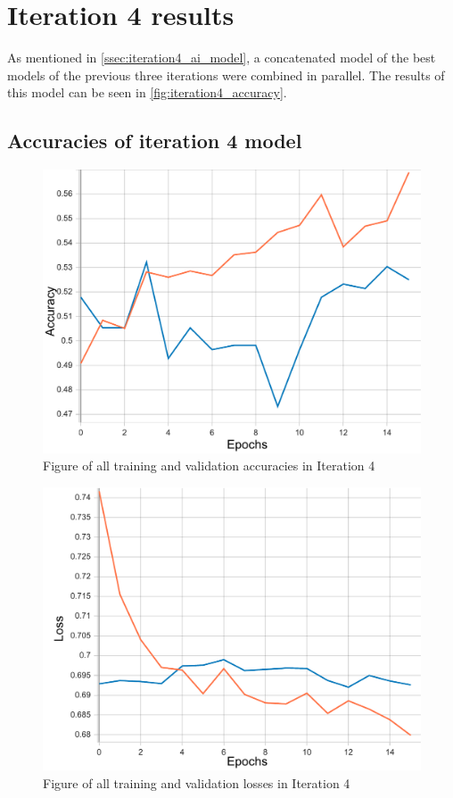 \section{Iteration 4 results}
As mentioned in \autoref{ssec:iteration4_ai_model}, a concatenated model of the best models of the previous 
three iterations were combined in parallel. The results of this model can be seen in
\autoref{fig:iteration4_accuracy}.

\subsection{Accuracies of iteration 4 model}

\begin{figure}[ht]
    \centering
    \includegraphics[width=0.95\columnwidth]{figures/results/concat/concat_acc.pdf}
    \caption[Accuracies for Iteration 4]{Figure of all training and validation accuracies in Iteration 4}
    \label{fig:iteration4_accuracy}
\end{figure}
\FloatBarrier

\begin{figure}[ht]
    \centering
    \includegraphics[width=0.95\columnwidth]{figures/results/concat/concat_loss.pdf}
    \caption[Losses for Iteration 4]{Figure of all training and validation losses in Iteration 4}
    \label{fig:iteration4_loss}
\end{figure}
\FloatBarrier

